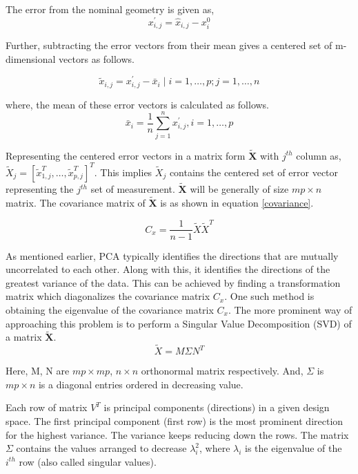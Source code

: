 The error from the nominal geometry is given as,
$$x_{i, j}^{\prime}=\hat{x}_{i, j}-x_{i}^{0}$$

Further, subtracting the error vectors from their mean gives a centered set of m-dimensional vectors as follows.

\begin{equation}
\tilde{x}_{i, j}=x_{i, j}^{\prime}-\bar{x}_{i} \mid i=1, \ldots, p ; j=1, \ldots, n
\end{equation}

where, the mean of these error vectors is calculated as follows.
\begin{equation}
\bar{x}_{i}=\frac{1}{n} \sum_{j=1}^{n} x_{i, j}^{\prime}, i=1, \ldots, p
\end{equation}

Representing the centered error vectors in a matrix form $\tilde{\textbf{X}}$ with $j^{th}$ column as, $\tilde{X}_{j}=\left[\tilde{x}_{1, j}^{T}, \ldots, \tilde{x}_{p, j}^{T}\right]^{T}$. This implies $\tilde{X}_{j}$ contains the centered set of error vector representing the $j^{th}$ set of measurement. $\tilde{\textbf{X}}$ will be generally of size $mp \times n$ matrix. The covariance matrix of $\tilde{\textbf{X}}$ is as shown in equation \ref{covariance}. 

\begin{equation}
C_{x}=\frac{1}{n-1} \tilde{X} \tilde{X}^{T}
\label{covariance}
\end{equation}

As mentioned earlier, PCA typically identifies the directions that are mutually uncorrelated to each other. Along with this, it identifies the directions of the greatest variance of the data. This can be achieved by finding a transformation matrix which diagonalizes the covariance matrix $C_x$. One such method is obtaining the eigenvalue of the covariance matrix $C_x$. The more prominent way of approaching this problem is to perform a Singular Value Decomposition (SVD) of a matrix $\tilde{\textbf{X}}$\cite{ghate}.
\begin{equation}
\tilde{X}=M \Sigma N^{T}
\end{equation}

Here, M, N are $mp \times mp$, $n \times n$ orthonormal matrix respectively. And, $\Sigma$ is $mp \times n$ is a diagonal entries ordered in decreasing value. 

Each row of matrix $V^T$ is principal components (directions) in a given design space. The first principal component (first row) is the most prominent direction for the highest variance. The variance keeps reducing down the rows. The matrix $ \Sigma $ contains the values arranged to decrease $\lambda_i^2$, where $\lambda_i$ is the eigenvalue of the $i^{th}$ row (also called singular values).


